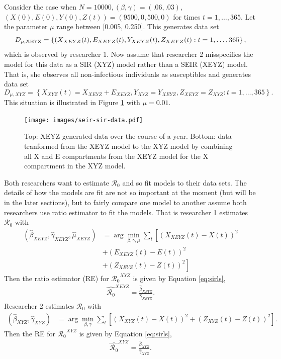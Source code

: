 \documentclass[12pt]{article}
\newcommand{\rr}{\ensuremath{\mathcal{R}_0}}
\begin{document}
Consider the case when $N=10000, (\beta, \gamma) = (.06, .03)$, $(X(0), E(0), Y(0), Z(t)) = (9500, 0, 500, 0)$ for times $t=1, \dots, 365$.  Let the parameter $\mu$ range between [0.005, 0.250].  This generates data set
$$D_{\mu, \textnormal{XEYZ}} = \left \{(X_{XEYZ}(t), E_{XEYZ}(t), Y_{XEYZ}(t), Z_{XEYZ}(t): t=1, \dots, 365\right \},$$
which is observed by researcher 1.  Now assume that researcher 2 misspecifies the model for this data as a SIR (XYZ) model rather than a SEIR (XEYZ) model.  That is, she observes all non-infectious individuals as susceptibles and generates data set
$$D_{\mu, XYZ} = \left \{X_{XYZ}(t) = X_{XEYZ} + E_{XEYZ}, Y_{XYZ} = Y_{XEYZ}, Z_{XEYZ} = Z_{XYZ} : t = 1, \dots, 365 \right \}.$$
This situation is illustrated in Figure \ref{fig:sir-vs-seir} with $\mu = 0.01$.

\begin{figure}
  \centering
  \texttt{[image: images/seir-sir-data.pdf]}
  \caption{Top: XEYZ generated data over the course of a year.  Bottom: data tranformed from the XEYZ model to the XYZ model by combining all X and E compartments from the XEYZ model for the X compartment in the XYZ model.}\label{fig:sir-vs-seir}
  \end{figure}

Both researchers want to estimate $\rr$ and so fit models to their data sets.  The details of how the models are fit are not so important at the moment (but will be in the later sections), but to fairly compare one model to another assume both researchers use ratio estimator to fit the models.  That is researcher 1 estimates $\rr$ with
\begin{align*}
  (\hat{\beta}_{XEYZ}, \hat{\gamma}_{XEYZ}, \hat{\mu}_{XEYZ} )&=\arg \min_{\beta, \gamma, \mu} \sum_{t} \left [ \left (X_{XEYZ}(t) - X(t)\right )^2  \right . \\
                                                                 &+\left ( E_{XEYZ}(t) - E(t) \right )^2  \\
  &\left . + \left ( Z_{XEYZ}(t) - Z(t) \right )^2\right ]
\end{align*}
Then the ratio estimator (RE) for $\rr^{XYZ}$ is given by Equation \ref{eq:sirls},
\begin{align*}
  \hat{\rr}^{XEYZ}= \frac{\hat{\beta}_{XEYZ}}{\hat{\gamma}_{XEYZ}}.
\end{align*}
Researcher 2 estimates $\rr$ with 
\begin{align*}
(\hat{\beta}_{XYZ}, \hat{\gamma}_{XYZ} )&=\arg \min_{\beta, \gamma} \sum_{t} \left [ \left (X_{XYZ}(t) - X(t)\right )^2 + \left ( Z_{XYZ}(t) - Z(t) \right )^2 \right ].
\end{align*}
Then the RE for $\rr^{XYZ}$ is given by Equation \ref{eq:sirls},
\begin{align*}
  \hat{\rr}^{XYZ}= \frac{\hat{\beta}_{XYZ}}{\hat{\gamma}_{XYZ}}.
\end{align*}
\end{document}
